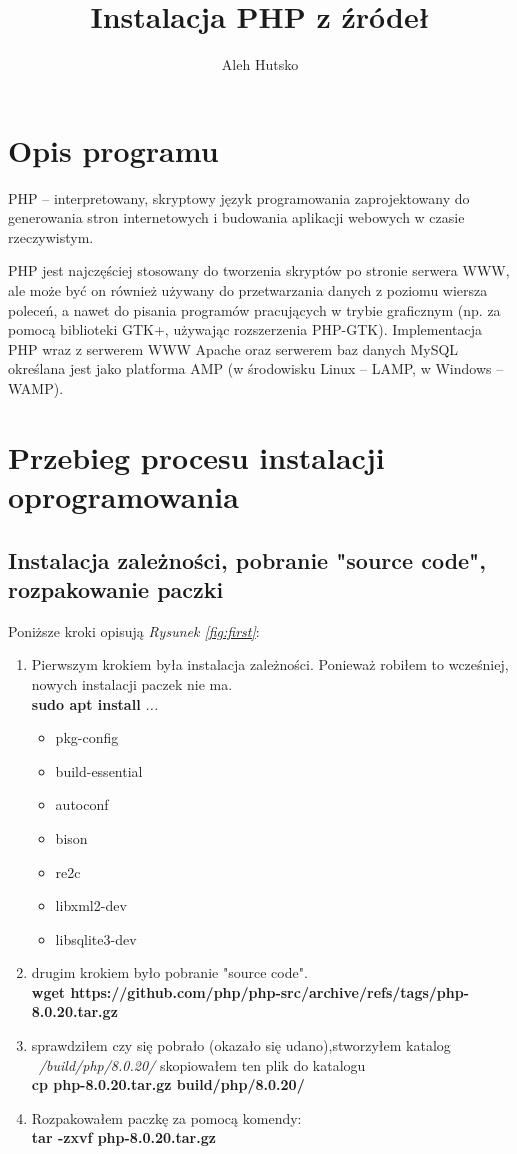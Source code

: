 \documentclass[a4paper,12pt,oneside]{report} %
\title{Instalacja PHP z źródeł }
\author{Aleh Hutsko}
\begin{document}
\maketitle


\tableofcontents{}
\chapter{Opis programu}

PHP – interpretowany, skryptowy język programowania zaprojektowany do generowania stron internetowych i budowania aplikacji webowych w czasie rzeczywistym.

PHP jest najczęściej stosowany do tworzenia skryptów po stronie serwera WWW, ale może być on również używany do przetwarzania danych z poziomu wiersza poleceń, a nawet do pisania programów pracujących w trybie graficznym (np. za pomocą biblioteki GTK+, używając rozszerzenia PHP-GTK). Implementacja PHP wraz z serwerem WWW Apache oraz serwerem baz danych MySQL określana jest jako platforma AMP (w środowisku Linux – LAMP, w Windows – WAMP).

\chapter{Przebieg procesu instalacji oprogramowania}
\section{Instalacja zależności, pobranie "source code", rozpakowanie paczki}

Poniższe kroki opisują \textit{Rysunek \ref{fig:first}}:

\begin{enumerate}
    \item Pierwszym krokiem była instalacja zależności. Ponieważ robiłem to wcześniej, nowych instalacji paczek nie ma. \\ \textbf{sudo apt install} \textit{...}
    \begin{itemize}
        \item pkg-config
        \item build-essential
        \item autoconf
        \item bison
        \item re2c
        \item libxml2-dev
        \item libsqlite3-dev
    \end{itemize}
    \item drugim krokiem było pobranie "source code". \\ \textbf{wget https://github.com/php/php-src/archive/refs/tags/php-8.0.20.tar.gz}
    \item sprawdziłem czy się pobrało (okazało się udano),stworzyłem katalog \textit{~/build/php/8.0.20/} skopiowałem ten plik do katalogu  \\ \textbf{cp php-8.0.20.tar.gz build/php/8.0.20/}
    \item Rozpakowałem paczkę za pomocą komendy: \\ \textbf{ tar -zxvf php-8.0.20.tar.gz}
\end{enumerate}
\end{document}
